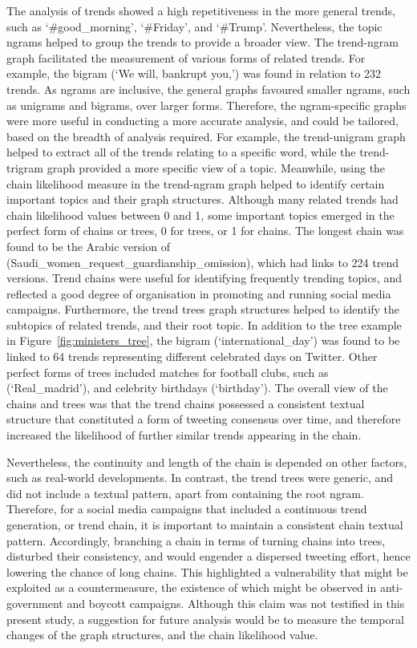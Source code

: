 \documentclass{comjnl}
\begin{document}
{The analysis of trends showed a high repetitiveness in the more general trends, such as ‘\#good\_morning’, ‘\#Friday’, and ‘\#Trump’. Nevertheless, the topic ngrams helped to group the trends to provide a broader view. The trend-ngram graph facilitated the measurement of various forms of related trends.  For example, the bigram (‘We will, bankrupt you,’) was found in relation to 232 trends. As ngrams are inclusive, the general graphs favoured smaller ngrams, such as unigrams and bigrams, over larger forms. Therefore, the ngram-specific graphs were more useful in conducting a more accurate analysis, and could be tailored, based on the breadth of analysis required.  For example, the trend-unigram graph helped to extract all of the trends relating to a specific word, while the trend-trigram graph provided a more specific view of a topic.  Meanwhile, using the chain likelihood measure in the trend-ngram graph helped to identify certain important topics and their graph structures. Although many related trends had chain likelihood values between 0 and 1, some important topics emerged in the perfect form of chains or trees, 0 for trees, or 1 for chains.  The longest chain was found to be the Arabic version of (Saudi\_women\_request\_guardianship\_omission), which had links to 224 trend versions. Trend chains were useful for identifying frequently trending topics, and reflected a good degree of organisation in promoting and running social media campaigns. Furthermore, the trend trees graph structures helped to identify the subtopics of related trends, and their root topic. In addition to the tree example in Figure~\ref{fig:ministers_tree}, the bigram (‘international\_day’) was found to be linked to 64 trends representing different celebrated days on Twitter. Other perfect forms of trees included matches for football clubs, such as (‘Real\_madrid’), and celebrity birthdays (‘birthday’).  The overall view of the chains and trees was that the trend chains possessed a consistent textual structure that constituted a form of tweeting consensus over time, and therefore increased the likelihood of further similar trends appearing in the chain. 


Nevertheless, the continuity and length of the chain is depended on other factors, such as real-world developments. In contrast, the trend trees were generic, and did not include a textual pattern, apart from containing the root ngram.  Therefore, for a social media campaigns that included a continuous trend generation, or trend chain, it is important to maintain a consistent chain textual pattern. Accordingly, branching a chain in terms of turning chains into trees, disturbed their consistency, and would engender a dispersed tweeting effort, hence lowering the chance of long chains.  This highlighted a vulnerability that might be exploited as a countermeasure, the existence of which might be observed in anti-government and boycott campaigns. Although this claim was not testified in this present study, a suggestion for future analysis would be to measure the temporal changes of the graph structures, and the chain likelihood value.  


}
\end{document}
